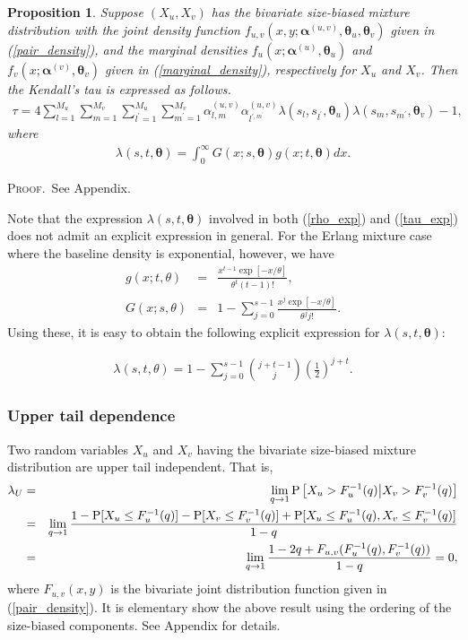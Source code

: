\documentclass[11pt]{article}
\newtheorem{prop}{Proposition}
\def\a{\alpha} \def\b{\beta}
\def\bea{\begin{eqnarray*}} \def\eea{\end{eqnarray*}}
\def\beq{\begin{eqnarray}} \def\eeq{\end{eqnarray}}
\def\proof{\textsc{Proof}.\ }
\def\mP{\text{P}}
\begin{document}
\begin{prop} Suppose $(X_u, X_v)$ has the bivariate size-biased mixture distribution with the joint density function $f_{u,v}(x, y; \bm{\a}^{(u,v)}, \bm{\theta}_u, \bm{\theta}_v)$ given in (\ref{pair_density}), and the marginal densities $f_u(x; \bm{\a}^{(u)}, \bm{\theta}_u)$ and $f_v(x; \bm{\a}^{(v)}, \bm{\theta}_v)$ given in (\ref{marginal_density}), respectively for $X_u$ and  $X_v$. Then the Kendall's tau is expressed as follows.
\beq\label{tau_exp}
\tau = 4\sum_{l = 1}^{M_u}\sum_{m = 1}^{M_v} \sum_{l^\prime = 1}^{M_u}\sum_{m^\prime = 1}^{M_v} \a^{(u,v)}_{l,m} \a^{(u,v)}_{l^{\prime, m^{\prime}}} \lambda(s_l, s_{l^\prime}, \bm{\theta}_u)\lambda(s_m, s_{m^\prime}, \bm{\theta}_v) -1, 
\eeq
where
\bea
\lambda(s, t, \bm{\theta}) = \int_0^{\infty} G(x;s, \bm{\theta})g(x; t, \bm{\theta})dx.
\eea
\end{prop}

\proof See Appendix.

Note that the expression $\lambda(s, t, \bm{\theta})$ involved in both (\ref{rho_exp}) and (\ref{tau_exp}) does not admit an explicit expression in general. For the Erlang mixture case where the baseline density is exponential, however, we have 
\bea
g(x; t, \theta) &=& \frac{x^{t-1}\exp[-x/\theta]}{\theta^t (t-1)!},\\
G(x; s, \theta) &=& 1- \sum_{j=0}^{s-1}\frac{x^j \exp[-x/\theta]}{\theta^j j!}.
\eea
Using these, it is easy to obtain the following explicit expression for $\lambda(s, t, \bm{\theta})$:

\beq
\lambda(s, t, \theta) = 1-  \sum_{j=0}^{s-1}\binom{j+t-1}{j}\left(\frac{1}{2}\right)^{j+t}.
\eeq


\subsubsection{Upper tail dependence} 
Two random variables $X_u$ and $X_v$ having the bivariate size-biased mixture distribution are upper tail independent.  That is,
\bea
\lambda_U &=& \lim_{q\rightarrow 1}\mP\left[X_u > F^{-1}_u(q)\big{|}X_v > F^{-1}_v(q)\right]\\
          &=& \lim_{q\rightarrow 1}\frac{1- \mP[X_u \le F^{-1}_u(q)] - \mP[X_v \le F^{-1}_v(q)] + \mP[X_u \le F^{-1}_u(q), X_v \le F^{-1}_v(q)]}{1-q}\\
					&=& \lim_{q\rightarrow 1}\frac{1-2q + F_{u,v}(F^{-1}_u(q),F^{-1}_v(q))}{1-q} = 0,	 
\eea
where $F_{u,v}(x,y)$ is the bivariate joint distribution function given in (\ref{pair_density}). It is elementary show the above result using the ordering of the size-biased components. See Appendix for details. 
\end{document}
